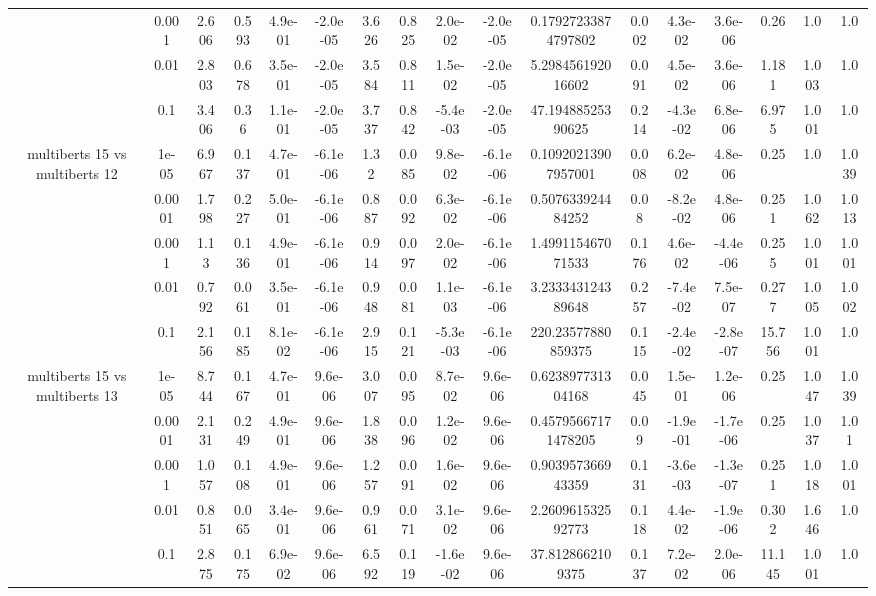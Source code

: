 \begin{tabular}{|c|c|c|c|c|c|c|c|c|c|c|c|c|c|c|c|c|}
 & 0.001 & 2.606 & 0.593 & 4.9e-01 & -2.0e-05 & 3.626 & 0.825 & 2.0e-02 & -2.0e-05 & 0.17927233874797802 & 0.002 & 4.3e-02 & 3.6e-06 & 0.26 & 1.0 & 1.0 \\
 & 0.01 & 2.803 & 0.678 & 3.5e-01 & -2.0e-05 & 3.584 & 0.811 & 1.5e-02 & -2.0e-05 & 5.298456192016602 & 0.091 & 4.5e-02 & 3.6e-06 & 1.181 & 1.003 & 1.0 \\
 & 0.1 & 3.406 & 0.36 & 1.1e-01 & -2.0e-05 & 3.737 & 0.842 & -5.4e-03 & -2.0e-05 & 47.19488525390625 & 0.214 & -4.3e-02 & 6.8e-06 & 6.975 & 1.001 & 1.0 \\
\hline
\multirow{5}{*}{multiberts 15 vs multiberts 12} & 1e-05 & 6.967 & 0.137 & 4.7e-01 & -6.1e-06 & 1.32 & 0.085 & 9.8e-02 & -6.1e-06 & 0.10920213907957001 & 0.008 & 6.2e-02 & 4.8e-06 & 0.25 & 1.0 & 1.039 \\
 & 0.0001 & 1.798 & 0.227 & 5.0e-01 & -6.1e-06 & 0.887 & 0.092 & 6.3e-02 & -6.1e-06 & 0.507633924484252 & 0.08 & -8.2e-02 & 4.8e-06 & 0.251 & 1.062 & 1.013 \\
 & 0.001 & 1.13 & 0.136 & 4.9e-01 & -6.1e-06 & 0.914 & 0.097 & 2.0e-02 & -6.1e-06 & 1.499115467071533 & 0.176 & 4.6e-02 & -4.4e-06 & 0.255 & 1.001 & 1.001 \\
 & 0.01 & 0.792 & 0.061 & 3.5e-01 & -6.1e-06 & 0.948 & 0.081 & 1.1e-03 & -6.1e-06 & 3.233343124389648 & 0.257 & -7.4e-02 & 7.5e-07 & 0.277 & 1.005 & 1.002 \\
 & 0.1 & 2.156 & 0.185 & 8.1e-02 & -6.1e-06 & 2.915 & 0.121 & -5.3e-03 & -6.1e-06 & 220.23577880859375 & 0.115 & -2.4e-02 & -2.8e-07 & 15.756 & 1.001 & 1.0 \\
\hline
\multirow{5}{*}{multiberts 15 vs multiberts 13} & 1e-05 & 8.744 & 0.167 & 4.7e-01 & 9.6e-06 & 3.007 & 0.095 & 8.7e-02 & 9.6e-06 & 0.623897731304168 & 0.045 & 1.5e-01 & 1.2e-06 & 0.25 & 1.047 & 1.039 \\
 & 0.0001 & 2.131 & 0.249 & 4.9e-01 & 9.6e-06 & 1.838 & 0.096 & 1.2e-02 & 9.6e-06 & 0.45795667171478205 & 0.09 & -1.9e-01 & -1.7e-06 & 0.25 & 1.037 & 1.01 \\
 & 0.001 & 1.057 & 0.108 & 4.9e-01 & 9.6e-06 & 1.257 & 0.091 & 1.6e-02 & 9.6e-06 & 0.903957366943359 & 0.131 & -3.6e-03 & -1.3e-07 & 0.251 & 1.018 & 1.001 \\
 & 0.01 & 0.851 & 0.065 & 3.4e-01 & 9.6e-06 & 0.961 & 0.071 & 3.1e-02 & 9.6e-06 & 2.260961532592773 & 0.118 & 4.4e-02 & -1.9e-06 & 0.302 & 1.646 & 1.0 \\
 & 0.1 & 2.875 & 0.175 & 6.9e-02 & 9.6e-06 & 6.592 & 0.119 & -1.6e-02 & 9.6e-06 & 37.8128662109375 & 0.137 & 7.2e-02 & 2.0e-06 & 11.145 & 1.001 & 1.0 \\

\end{tabular}
